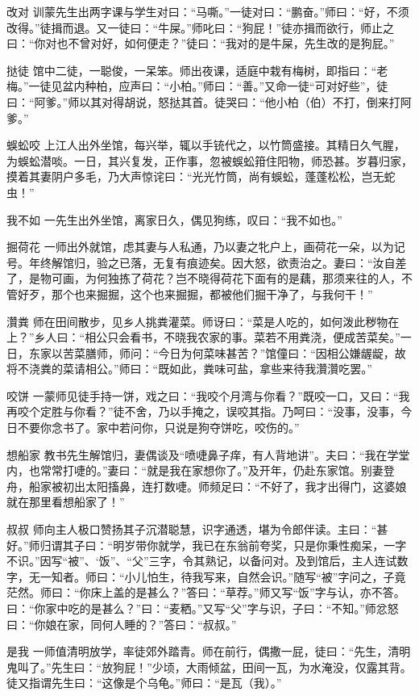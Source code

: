 \documentclass[12pt,UTF8]{ctexbook}
\begin{document}
改对
训蒙先生出两字课与学生对曰：“马嘶。”一徒对曰：“鹏奋。”师曰：“好，不须改得。”徒揖而退。又一徒曰：“牛屎。”师叱曰：“狗屁！”徒亦揖而欲行，师止之曰：“你对也不曾对好，如何便走？”徒曰：“我对的是牛屎，先生改的是狗屁。”

挞徒
馆中二徒，一聪俊，一呆笨。师出夜课，适庭中栽有梅树，即指曰：“老梅。”一徒见盆内种柏，应声曰：“小柏。”师曰：“善。”又命一徒“可对好些”，徒曰：“阿爹。”师以其对得胡说，怒挞其首。徒哭曰：“他小柏（伯）不打，倒来打阿爹。”

蜈蚣咬
上江人出外坐馆，每兴举，辄以手铳代之，以竹筒盛接。其精日久气腥，为蜈蚣潜啖。一日，其兴复发，正作事，忽被蜈蚣箝住阳物，师恐甚。岁暮归家，摸着其妻阴户多毛，乃大声惊诧曰：“光光竹筒，尚有蜈蚣，蓬蓬松松，岂无蛇虫！”

我不如
一先生出外坐馆，离家日久，偶见狗练，叹曰：“我不如也。”

掘荷花
一师出外就馆，虑其妻与人私通，乃以妻之牝户上，画荷花一朵，以为记号。年终解馆归，验之已落，无复有痕迹矣。因大怒，欲责治之。妻曰：“汝自差了，是物可画，为何独拣了荷花？岂不晓得荷花下面有的是藕，那须来往的人，不管好歹，那个也来掘掘，这个也来掘掘，都被他们掘干净了，与我何干！”

灒粪
师在田间散步，见乡人挑粪灌菜。师讶曰：“菜是人吃的，如何泼此秽物在上？”乡人曰：“相公只会看书，不晓我农家的事。菜若不用粪浇，便成苦菜矣。”一日，东家以苦菜膳师，师问：“今日为何菜味甚苦？”馆僮曰：“因相公嫌龌龊，故将不浇粪的菜请相公。”师曰：“既如此，粪味可盐，拿些来待我灒灒吃罢。”

咬饼
一蒙师见徒手持一饼，戏之曰：“我咬个月湾与你看？”既咬一口，又曰：“我再咬个定胜与你看？”徒不舍，乃以手掩之，误咬其指。乃呵曰：“没事，没事，今日不要你念书了。家中若问你，只说是狗夺饼吃，咬伤的。”

想船家
教书先生解馆归，妻偶谈及“喷啑鼻子痒，有人背地讲”。夫曰：“我在学堂内，也常常打啑的。”妻曰：“就是我在家想你了。”及开年，仍赴东家馆。别妻登舟，船家被初出太阳搐鼻，连打数啑。师频足曰：“不好了，我才出得门，这婆娘就在那里看想船家了！”

叔叔
师向主人极口赞扬其子沉潜聪慧，识字通透，堪为令郎伴读。主曰：“甚好。”师归谓其子曰：“明岁带你就学，我已在东翁前夸奖，只是你秉性痴呆，一字不识。”因写“被”、‘饭”、“父”三字，令其熟记，以备问对。及到馆后，主人连试数字，无一知者。师曰：“小儿怕生，待我写来，自然会识。”随写“被”字问之，子竟茫然。师曰：“你床上盖的是甚么？”答曰：“草荐。”师又写“饭”字与认，亦不答。曰：“你家中吃的是甚么？”曰：“麦粞。”又写“父”字与识，子曰：“不知。”师忿怒曰：“你娘在家，同何人睡的？”答曰：“叔叔。”

是我
一师值清明放学，率徒郊外踏青。师在前行，偶撒一屁，徒曰：“先生，清明鬼叫了。”先生曰：“放狗屁！”少顷，大雨倾盆，田间一瓦，为水淹没，仅露其背。徒又指谓先生曰：“这像是个乌龟。”师曰：“是瓦（我）。”
\end{document}
